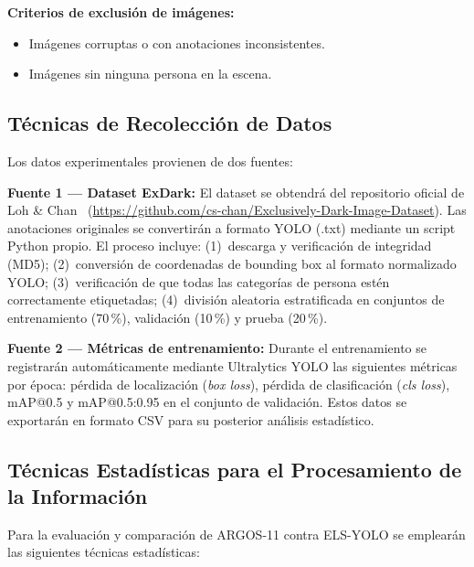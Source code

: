 \textbf{Criterios de exclusi\'on de im\'agenes:}
\begin{itemize}
  \item Im\'agenes corruptas o con anotaciones inconsistentes.
  \item Im\'agenes sin ninguna persona en la escena.
\end{itemize}

\subsection{T\'ecnicas de Recolecci\'on de Datos}

Los datos experimentales provienen de dos fuentes:

\textbf{Fuente 1 --- Dataset ExDark:}
El dataset se obtendr\'a del repositorio oficial de
Loh \& Chan~\cite{Loh2019}
(\url{https://github.com/cs-chan/Exclusively-Dark-Image-Dataset}).
Las anotaciones originales se convertir\'an a formato YOLO (.txt)
mediante un script Python propio. El proceso incluye:
(1)~descarga y verificaci\'on de integridad (MD5);
(2)~conversi\'on de coordenadas de bounding box al formato
normalizado YOLO;
(3)~verificaci\'on de que todas las categor\'{i}as de persona est\'en
correctamente etiquetadas;
(4)~divisi\'on aleatoria estratificada en conjuntos de
entrenamiento (70\,\%), validaci\'on (10\,\%) y prueba (20\,\%).

\textbf{Fuente 2 --- M\'etricas de entrenamiento:}
Durante el entrenamiento se registrar\'an autom\'aticamente mediante
Ultralytics YOLO las siguientes m\'etricas por \'epoca:
p\'erdida de localizaci\'on (\textit{box loss}), p\'erdida de
clasificaci\'on (\textit{cls loss}), mAP@0.5 y mAP@0.5:0.95 en el
conjunto de validaci\'on. Estos datos se exportar\'an en formato CSV
para su posterior an\'alisis estad\'{i}stico.

\subsection{T\'ecnicas Estad\'{i}sticas para el Procesamiento de
la Informaci\'on}

Para la evaluaci\'on y comparaci\'on de ARGOS-11 contra ELS-YOLO
se emplear\'an las siguientes t\'ecnicas estad\'{i}sticas:

